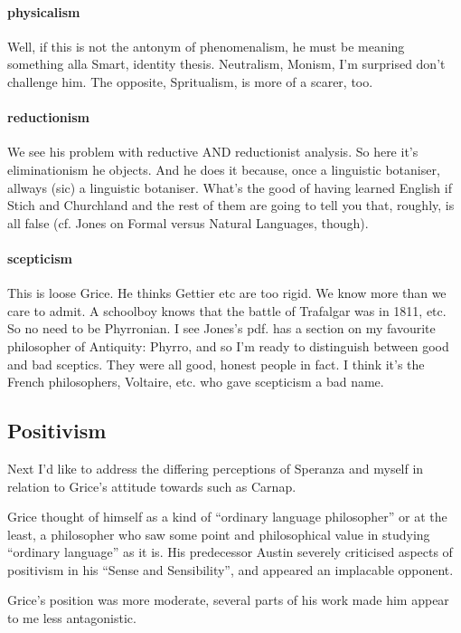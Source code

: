 \documentclass{article}
\begin{document}
\paragraph{physicalism}
Well, if this is not the antonym of phenomenalism, he must be  
meaning something alla Smart, identity thesis. Neutralism, Monism, I'm 
surprised  don't challenge him. The opposite, Spritualism, is more of a scarer, 
too.
 
\paragraph{reductionism}
We see his problem with reductive AND reductionist analysis.  
So here it's eliminationism he objects. And he does it because, once a  
linguistic botaniser, allways (sic) a linguistic botaniser. What's the good of  
having learned English if Stich and Churchland and the rest of them are 
going to  tell you that, roughly, is all false (cf. Jones on Formal versus 
Natural  Languages, though).
 
\paragraph{scepticism}
This is loose Grice. He thinks Gettier etc are too rigid. We  
know more than we care to admit. A schoolboy knows that the battle of 
Trafalgar  was in 1811, etc. So no need to be Phyrronian. I see Jones's pdf. has a 
section  on my favourite philosopher of Antiquity: Phyrro, and so I'm ready 
to  distinguish between good and bad sceptics. They were all good, honest 
people in  fact. I think it's the French philosophers, Voltaire, etc. who gave 
scepticism a  bad name.

\subsection{Positivism}

Next I'd like to address the differing perceptions of Speranza and myself in relation to Grice's attitude towards such as Carnap.

Grice thought of himself as a kind of ``ordinary language philosopher'' or at the least, a philosopher who saw some point and philosophical value in studying ``ordinary language'' as it is.
His predecessor Austin severely criticised aspects of positivism in his ``Sense and Sensibility'', and appeared an implacable opponent.

Grice's position was more moderate, several parts of his work made him appear to me less antagonistic.
\end{document}

